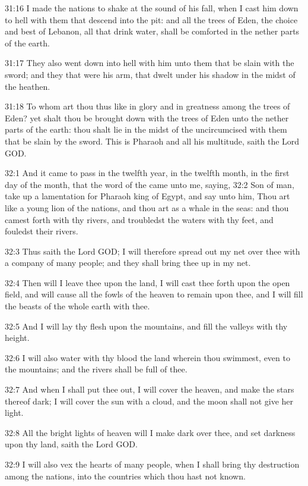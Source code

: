 31:16 I made the nations to shake at the sound of his fall, when I
cast him down to hell with them that descend into the pit: and all the
trees of Eden, the choice and best of Lebanon, all that drink water,
shall be comforted in the nether parts of the earth.

31:17 They also went down into hell with him unto them that be slain
with the sword; and they that were his arm, that dwelt under his
shadow in the midst of the heathen.

31:18 To whom art thou thus like in glory and in greatness among the
trees of Eden? yet shalt thou be brought down with the trees of Eden
unto the nether parts of the earth: thou shalt lie in the midst of the
uncircumcised with them that be slain by the sword. This is Pharaoh
and all his multitude, saith the Lord GOD.

32:1 And it came to pass in the twelfth year, in the twelfth month, in
the first day of the month, that the word of the \LORD came unto me,
saying, 32:2 Son of man, take up a lamentation for Pharaoh king of
Egypt, and say unto him, Thou art like a young lion of the nations,
and thou art as a whale in the seas: and thou camest forth with thy
rivers, and troubledst the waters with thy feet, and fouledst their
rivers.

32:3 Thus saith the Lord GOD; I will therefore spread out my net over
thee with a company of many people; and they shall bring thee up in my
net.

32:4 Then will I leave thee upon the land, I will cast thee forth upon
the open field, and will cause all the fowls of the heaven to remain
upon thee, and I will fill the beasts of the whole earth with thee.

32:5 And I will lay thy flesh upon the mountains, and fill the valleys
with thy height.

32:6 I will also water with thy blood the land wherein thou swimmest,
even to the mountains; and the rivers shall be full of thee.

32:7 And when I shall put thee out, I will cover the heaven, and make
the stars thereof dark; I will cover the sun with a cloud, and the
moon shall not give her light.

32:8 All the bright lights of heaven will I make dark over thee, and
set darkness upon thy land, saith the Lord GOD.

32:9 I will also vex the hearts of many people, when I shall bring thy
destruction among the nations, into the countries which thou hast not
known.

